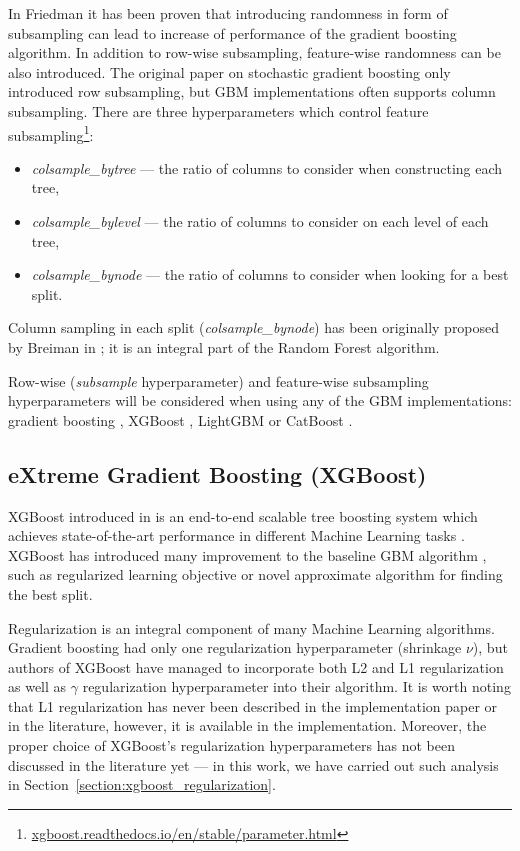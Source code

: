 \documentclass[magisterska, english]{pwr_wmat_praca_dyplomowa}
\theoremstyle{plain}
\numberwithin{theorem}{chapter}
\theoremstyle{definition}
\numberwithin{theorem}{chapter}
\begin{document}
In Friedman \cite{friedman_stoch} it has been proven that introducing randomness in form of subsampling can lead to increase of performance of the gradient boosting algorithm. In addition to row-wise subsampling, feature-wise randomness can be also introduced. The original paper on stochastic gradient boosting \cite{friedman_stoch}  only introduced row subsampling, but GBM implementations often supports column subsampling. There are three hyperparameters which control feature subsampling\footnote{\url{xgboost.readthedocs.io/en/stable/parameter.html}}:

\begin{itemize}
    \item\emph{colsample\_bytree} --- the ratio of columns to consider when constructing each tree,
    \item\emph{colsample\_bylevel} --- the ratio of columns to consider on each level of each tree,
    \item\emph{colsample\_bynode} --- the ratio of columns to consider when looking for a best split.
\end{itemize}
Column sampling in each split (\emph{colsample\_bynode}) has been originally proposed by Breiman in \cite{random_forest}; it is an integral part of the Random Forest algorithm.

Row-wise (\emph{subsample} hyperparameter) and feature-wise subsampling hyperparameters will be considered when using any of the GBM implementations: gradient boosting \cite{friedman_gbm}, XGBoost \cite{xgboost}, LightGBM \cite{lightgbm} or CatBoost \cite{catboost}.

\subsection{eXtreme Gradient Boosting (XGBoost)}
XGBoost introduced in \cite{xgboost} is an end-to-end scalable tree boosting system which achieves state-of-the-art performance in different Machine Learning tasks \cite{xgboost}. XGBoost has introduced many improvement to the baseline GBM algorithm \cite{friedman_gbm}, such as regularized learning objective or novel approximate algorithm for finding the best split.

Regularization is an integral component of many Machine Learning algorithms. Gradient boosting \cite{friedman_gbm} had only one regularization hyperparameter (shrinkage $\nu$), but authors of XGBoost have managed to incorporate both L2 and L1 regularization as well as $\gamma$ regularization hyperparameter into their algorithm. It is worth noting that L1 regularization has never been described in the implementation paper \cite{xgboost} or in the literature, however, it is available in the implementation. Moreover, the proper choice of XGBoost's regularization hyperparameters has not been discussed in the literature yet --- in this work, we have carried out such analysis in Section~\ref{section:xgboost_regularization}.
\end{document}
